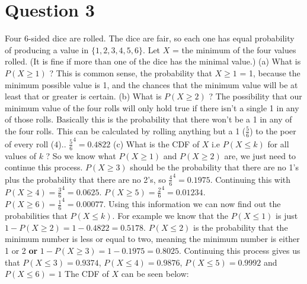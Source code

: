 \documentclass[12pt]{report}
\begin{document}
\section{Question 3}
Four 6-sided dice are rolled. The dice are fair, so each one has equal probability of producing a value in $\{1,2,3,4,5,6\}$. Let $X$ = the minimum of the four values rolled. (It is fine if more than one of the dice has the minimal value.)
\newline
\newline
(a) What is $P(X \geq 1)$ ?
\newline
This is common sense, the probability that $X \geq 1$ = 1, because the minimum possible value is 1, and the chances that the minimum value will be at least that or greater is certain. 
\newline
\newline
(b) What is $P(X \geq 2)$ ?
\newline
The possibility that our minimum value of the four rolls will only hold true if there isn't a single 1 in any of those rolls. Basically this is the probability that there won't be a 1 in any of the four rolls. This can be calculated by rolling anything but a 1 ($\frac{5}{6}$) to the poer of every roll ($4$).. $\frac{5}{6}^4 = 0.4822$  
\newline
\newline
\newpage
(c) What is the CDF of $X$ i.e $P(X \leq k)$ for all values of $k$ ?
\newline
\newline
So we know what $P(X \geq 1)$ and $P(X \geq 2)$ are, we just need to continue this process. $P(X \geq 3)$ should be the probability that there are no 1's plus the probability that there are no 2's, so $\frac{4}{6}^4 = 0.1975$. Continuing this with $P(X \geq 4) = \frac{3}{6}^4 = 0.0625$. $P(X \geq 5) = \frac{2}{6}^4 = 0.01234$. $P(X \geq 6) = \frac{1}{6}^4 = 0.00077$. Using this information we can now find out the probabilities that $P(X \leq k)$. For example we know that the $P(X \leq 1)$ is just $1 - P(X \geq 2) = 1 - 0.4822 = 0.5178$. $P(X \leq 2)$ is the probability that the minimum number is less or equal to two, meaning the minimum number is either 1 or 2 \textbf{or} $1 - P(X \geq 3) = 1 - 0.1975 = 0.8025$. Continuing this process gives us that $P(X \leq 3) = 0.9374$, $P(X \leq 4) = 0.9876$, $P(X \leq 5) = 0.9992$ and $P(X \leq 6) = 1$
\newline
The CDF of $X$ can be seen below:
\newline
\begin{center}
\end{center}
\end{document}
